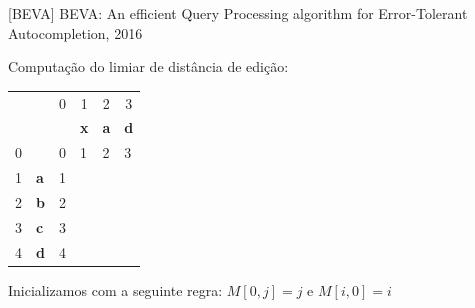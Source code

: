 \documentclass[11pt]{beamer}
\begin{document}
\begin{frame}{[BEVA] BEVA: An efficient Query Processing algorithm for Error-Tolerant Autocompletion, 2016}

    Computação do limiar de distância de edição:
  
    \begin{table}[]
    \begin{tabular}{llllll}
     &  & \multicolumn{1}{c}{{\color[HTML]{656565} 0}} & \multicolumn{1}{c}{{\color[HTML]{656565} 1}} & \multicolumn{1}{c}{{\color[HTML]{656565} 2}} & \multicolumn{1}{c}{{\color[HTML]{656565} 3}} \\
     &  &  & \textbf{x} & \textbf{a} & \textbf{d} \\ \cline{3-6} 
    {\color[HTML]{656565} 0} & \multicolumn{1}{l|}{} & \multicolumn{1}{l|}{{\color[HTML]{000000} 0}} & \multicolumn{1}{l|}{{\color[HTML]{000000} 1}} & \multicolumn{1}{l|}{{\color[HTML]{000000} 2}} & \multicolumn{1}{l|}{{\color[HTML]{000000} 3}} \\ \cline{3-6} 
    {\color[HTML]{656565} 1} & \multicolumn{1}{l|}{\textbf{a}} & \multicolumn{1}{l|}{{\color[HTML]{000000} 1}} & \multicolumn{1}{l|}{{\color[HTML]{000000} }} & \multicolumn{1}{l|}{{\color[HTML]{000000} }} & \multicolumn{1}{l|}{{\color[HTML]{000000} }} \\ \cline{3-6} 
    {\color[HTML]{656565} 2} & \multicolumn{1}{l|}{\textbf{b}} & \multicolumn{1}{c|}{{\color[HTML]{000000} 2}} & \multicolumn{1}{c|}{{\color[HTML]{000000} }} & \multicolumn{1}{c|}{{\color[HTML]{000000} }} & \multicolumn{1}{c|}{{\color[HTML]{000000} }} \\ \cline{3-6} 
    {\color[HTML]{656565} 3} & \multicolumn{1}{l|}{\textbf{c}} & \multicolumn{1}{l|}{{\color[HTML]{000000} 3}} & \multicolumn{1}{l|}{{\color[HTML]{000000} }} & \multicolumn{1}{l|}{{\color[HTML]{000000} }} & \multicolumn{1}{l|}{{\color[HTML]{000000} }} \\ \cline{3-6} 
    {\color[HTML]{656565} 4} & \multicolumn{1}{l|}{\textbf{d}} & \multicolumn{1}{c|}{{\color[HTML]{000000} 4}} & \multicolumn{1}{c|}{{\color[HTML]{000000} }} & \multicolumn{1}{c|}{{\color[HTML]{000000} }} & \multicolumn{1}{c|}{{\color[HTML]{000000} }} \\ \cline{3-6} 
    \end{tabular}
    \end{table}
    
    Inicializamos com a seguinte regra: $M[0, j] = j$ e $M[i, 0] = i$
    
\end{frame}
\end{document}
